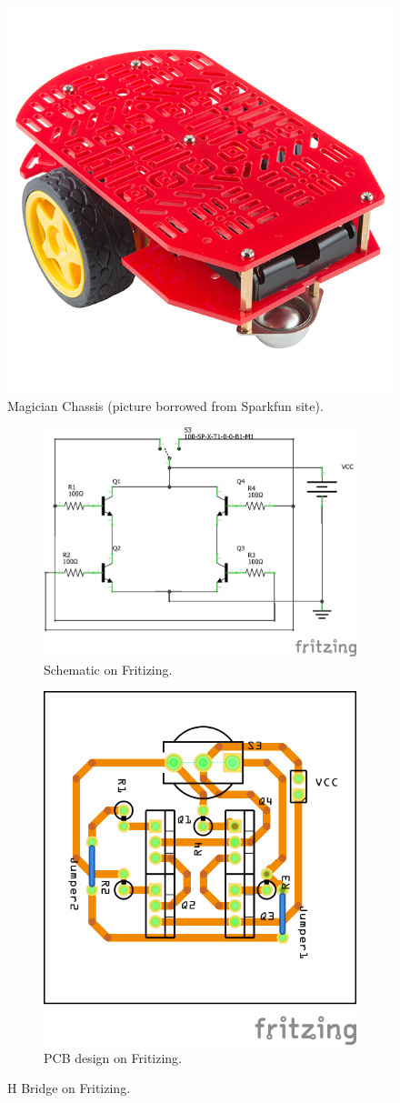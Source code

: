 \begin{figure}[t]
\centering
\centering%
\includegraphics[height=.35\textwidth]{img/magician.jpg}
\caption{Magician Chassis (picture borrowed from Sparkfun site).}
\label{fig:mag}%
\end{figure}

\begin{figure}
\centering
\begin{subfigure}{\columnwidth}
\centering
\includegraphics[height=.65\textwidth]{img/ponteH_schem.png}
\caption{Schematic on Fritizing.}
\label{fig:schem_fritz}
\end{subfigure}

\begin{subfigure}{\columnwidth}
\centering
\includegraphics[height=.75\textwidth]{img/ponteH_pcb.png}
\caption{PCB design on Fritizing.}
\label{fig:pcb_fritz}
\end{subfigure}

\caption{H Bridge on Fritizing.}
\end{figure}


